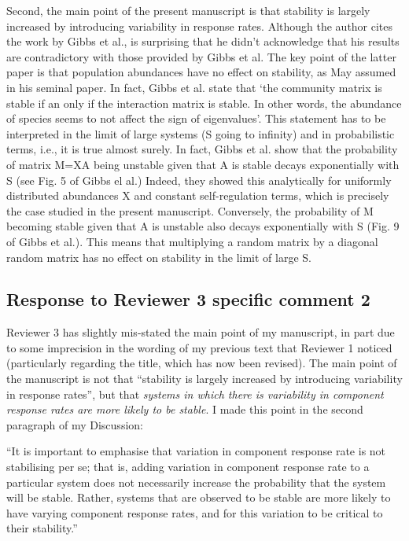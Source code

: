 \documentclass[]{article}
\begin{document}
Second, the main point of the present manuscript is that stability is
largely increased by introducing variability in response rates. Although
the author cites the work by Gibbs et al., is surprising that he didn't
acknowledge that his results are contradictory with those provided by
Gibbs et al. The key point of the latter paper is that population
abundances have no effect on stability, as May assumed in his seminal
paper. In fact, Gibbs et al. state that `the community matrix is stable
if an only if the interaction matrix is stable. In other words, the
abundance of species seems to not affect the sign of eigenvalues'. This
statement has to be interpreted in the limit of large systems (S going
to infinity) and in probabilistic terms, i.e., it is true almost surely.
In fact, Gibbs et al. show that the probability of matrix M=XA being
unstable given that A is stable decays exponentially with S (see Fig. 5
of Gibbs el al.) Indeed, they showed this analytically for uniformly
distributed abundances X and constant self-regulation terms, which is
precisely the case studied in the present manuscript. Conversely, the
probability of M becoming stable given that A is unstable also decays
exponentially with S (Fig. 9 of Gibbs et al.). This means that
multiplying a random matrix by a diagonal random matrix has no effect on
stability in the limit of large S.

\subsection{Response to Reviewer 3 specific comment
2}\label{response-to-reviewer-3-specific-comment-2}

Reviewer 3 has slightly mis-stated the main point of my manuscript, in
part due to some imprecision in the wording of my previous text that
Reviewer 1 noticed (particularly regarding the title, which has now been
revised). The main point of the manuscript is not that ``stability is
largely increased by introducing variability in response rates'', but
that \emph{systems in which there is variability in component response
rates are more likely to be stable}. I made this point in the second
paragraph of my Discussion:

``It is important to emphasise that variation in component response rate
is not stabilising per se; that is, adding variation in component
response rate to a particular system does not necessarily increase the
probability that the system will be stable. Rather, systems that are
observed to be stable are more likely to have varying component response
rates, and for this variation to be critical to their stability.''
\end{document}
